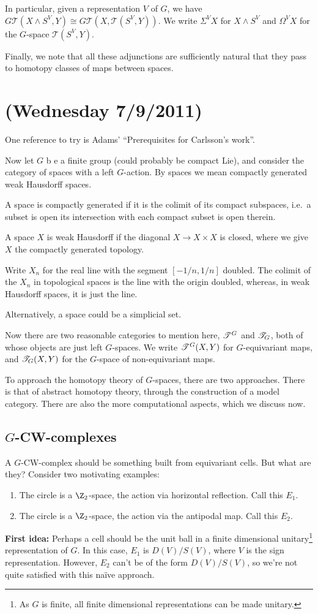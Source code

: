 \documentclass[11pt]{article}
\newcommand{\NewLecture}[3]{\section{#1 {\small(#2/#3/2011)}}}
\begin{document}
\begin{FirstNineLectures}
In particular, given a representation $V$ of $G$, we have
$G\mathscr{T}(X\wedge S^V, Y)\cong G\mathscr{T}(X,\mathscr{T}(S^V,Y))$. We write $\Sigma^V X$ for $X\wedge S^V$ and $\Omega^V X$ for the $G$-space $\mathscr{T}(S^V,Y)$.

Finally, we note that all these adjunctions are sufficiently natural that they pass to homotopy classes of maps between spaces.


\NewLecture{}{Wednesday 7}{9}
One reference to try is Adams' ``Prerequisites for Carlsson's work''.

Now let $G$ b e a finite group (could probably be compact Lie), and consider the category of spaces with a left $G$-action. By spaces we mean compactly generated weak Hausdorff spaces.
\begin{itemise}
\item A space is compactly generated if it is the colimit of its compact subspaces, i.e.\ a subset is open \Iff its intersection with each compact subset is open therein.
\item A space $X$ is weak Hausdorff if the diagonal $X\to X\times X$ is closed, where we give $X$ the compactly generated topology.
\item Write $X_n$ for the real line with the segment $[-1/n,1/n]$ doubled. The colimit of the $X_n$ in topological spaces is the line with the origin doubled, whereas, in weak Hausdorff spaces, it is just the line.
\end{itemise}
Alternatively, a space could be a simplicial set.

Now there are two reasonable categories to mention here, $\mathscr{T}^G$ and $\mathscr{T}_G$, both of whose objects are just left $G$-spaces. We write $\mathscr{T}^G(X,Y)$ for $G$-equivariant maps, and $\mathscr{T}_G(X,Y)$ for the $G$-space of non-equivariant maps.

To approach the homotopy theory of $G$-spaces, there are two approaches. There is that of abstract homotopy theory, through the construction of a model category. There are also the more computational aspects, which we discuss now.
\subsection*{$G$-CW-complexes}
A $G$-CW-complex should be something built from equivariant cells. But what are they? Consider two motivating examples:
\begin{enumerate}\squishlist
\item The circle is a $\Z_2$-space, the action via horizontal reflection. Call this $E_1$.
\item The circle is a $\Z_2$-space, the action via the antipodal map. Call this $E_2$.
\end{enumerate}
\textbf{First idea:} Perhaps a cell should be the unit ball in a finite dimensional unitary\footnote{As $G$ is finite, all finite dimensional representations can be made unitary.} representation of $G$.
In this case, $E_1$ is $D(V)/S(V)$, where $V$ is the sign representation. However, $E_2$ can't be of the form $D(V)/S(V)$, so we're not quite satisfied with this na\"ive approach.


\end{FirstNineLectures}
\end{document}
